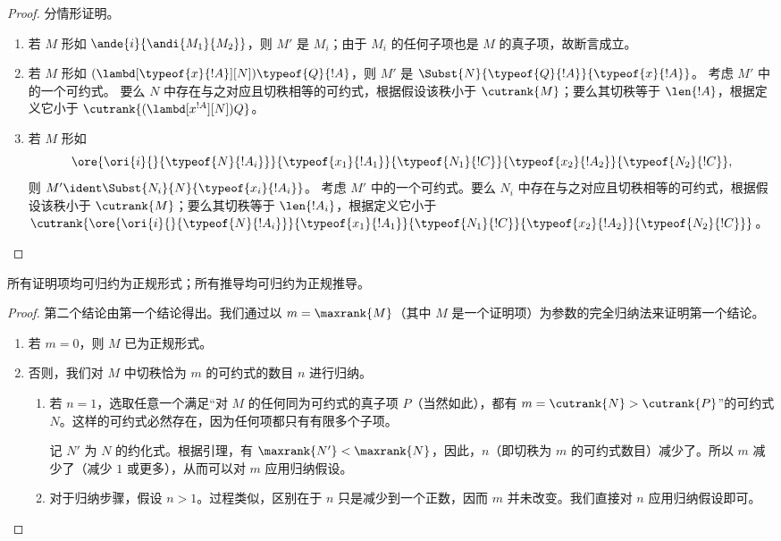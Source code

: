 \documentclass[../../../include/open-logic-section]{subfiles}
\begin{document}
\begin{proof}
  分情形证明。
  \begin{enumerate}
  \item 若 $M$ 形如 $\ande{i}{\andi{M_1}{M_2}}$，则 $M'$ 是
    $M_i$；由于 $M_i$ 的任何子项也是 $M$ 的真子项，故断言成立。
  \item 若 $M$ 形如
    $(\lambd[\typeof{x}{!A}][N])\typeof{Q}{!A}$，则 $M'$ 是
    $\Subst{N}{\typeof{Q}{!A}}{\typeof{x}{!A}}$。 考虑 $M'$ 中的一个可约式。
      要么 $N$ 中存在与之对应且切秩相等的可约式，根据假设该秩小于 $\cutrank{M}$；要么其切秩等于 $\len{!A}$，根据定义它小于
    $\cutrank{(\lambd[x^{!A}][N])Q}$。
  \item 若 $M$ 形如
    \[
    \ore{\ori{i}{}{\typeof{N}{!A_i}}}
        {\typeof{x_1}{!A_1}}{\typeof{N_1}{!C}}
        {\typeof{x_2}{!A_2}}{\typeof{N_2}{!C}},
    \]
    则 $M' \ident \Subst{N_i}{N}{\typeof{x_i}{!A_i}}$。 考虑
    $M'$ 中的一个可约式。要么 $N_i$ 中存在与之对应且切秩相等的可约式，根据假设该秩小于 $\cutrank{M}$；要么其切秩等于 $\len{!A_i}$，根据定义它小于
    $\cutrank{\ore{\ori{i}{}{\typeof{N}{!A_i}}}
      {\typeof{x_1}{!A_1}}{\typeof{N_1}{!C}}
      {\typeof{x_2}{!A_2}}{\typeof{N_2}{!C}}}$。
  \end{enumerate}
\end{proof}

\begin{thm}
  所有证明项均可归约为正规形式；所有推导均可归约为正规推导。
\end{thm}

\begin{proof}
  第二个结论由第一个结论得出。我们通过以 $m=\maxrank{M}$（其中 $M$ 是一个证明项）为参数的完全归纳法来证明第一个结论。
  \begin{enumerate}

  \item 若 $m=0$，则 $M$ 已为正规形式。
  \item
    否则，我们对 $M$ 中切秩恰为 $m$ 的可约式的数目 $n$ 进行归纳。
    \begin{enumerate}
    \item 若 $n=1$，选取任意一个满足“对 $M$ 的任何同为可约式的真子项 $P$（当然如此），都有 $m = \cutrank{N} >
      \cutrank{P}$”的可约式 $N$。这样的可约式必然存在，因为任何项都只有有限多个子项。

      记 $N'$ 为 $N$ 的约化式。根据引理，有 $\maxrank{N'} < \maxrank{N}$，因此，$n$（即切秩为 $m$ 的可约式数目）减少了。所以 $m$ 减少了（减少 $1$ 或更多），从而可以对 $m$ 应用归纳假设。
    \item 对于归纳步骤，假设 $n>1$。过程类似，区别在于 $n$ 只是减少到一个正数，因而 $m$ 并未改变。我们直接对 $n$ 应用归纳假设即可。
    \end{enumerate}
\end{enumerate}
\end{proof}
\end{document}
